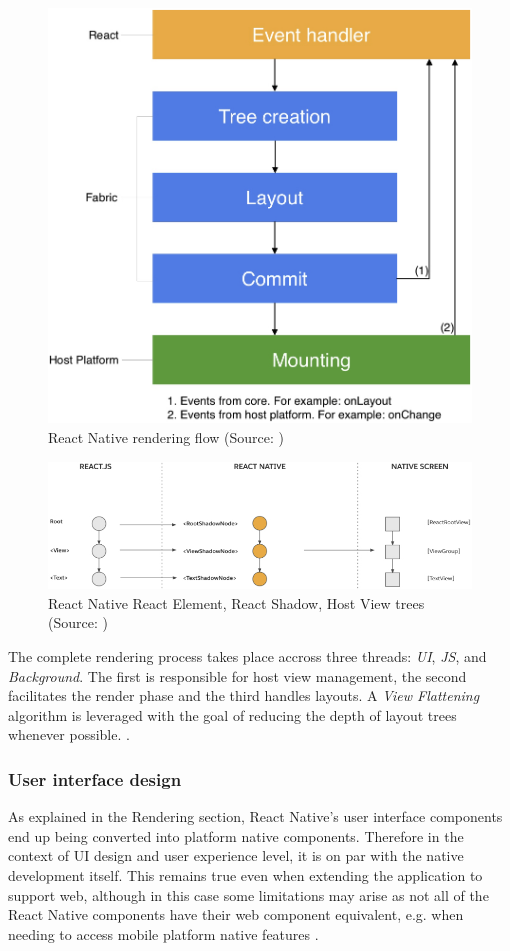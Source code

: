 \begin{figure}[h]
	\centering
	\includegraphics[width=.55\textwidth]{img/rn_render}
	\caption{React Native rendering flow (Source: \cite{react_native_docs_render})}
	\label{fig:rn_render_flow}
\end{figure}

\begin{figure}[h]
	\centering
	\includegraphics[width=\textwidth]{img/rn_trees}
	\caption{React Native React Element, React Shadow, Host View trees (Source: \cite{react_native_docs_render})}
	\label{fig:rn_trees}
\end{figure}

The complete rendering process takes place accross three threads: \emph{UI}, \emph{JS}, and \emph{Background}. The first is responsible for host view management, the second facilitates the render phase and the third handles layouts. A \emph{View Flattening} algorithm is leveraged with the goal of reducing the depth of layout trees whenever possible.  \cite{react_native_docs_render,react_native_docs_view_flattening,react_native_docs_threading}. 

\subsubsection*{User interface design}

As explained in the Rendering section, React Native's user interface components end up being converted into platform native components. Therefore in the context of UI design and user experience level, it is on par with the native development itself. This remains true even when extending the application to support web, although in this case some limitations may arise as not all of the React Native components have their web component equivalent, e.g. when needing to access mobile platform native features \cite{harsh_complete_guide_to_rn_web}.

